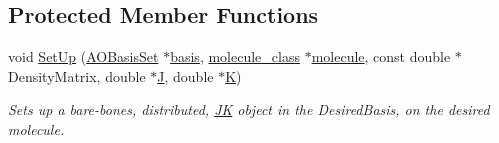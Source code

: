 \subsection*{Protected Member Functions}
\begin{DoxyCompactItemize}
\item 
void \hyperlink{classJKBuilder_1_1JK_a13b685265e196c183897777ec2f3136a}{SetUp} (\hyperlink{classJKBuilder_1_1AOBasisSet}{AOBasisSet} $\ast$\hyperlink{classJKBuilder_1_1JK_a81392b84b45d3cf84c5c105e9fd5d09c}{basis}, \hyperlink{classJKBuilder_1_1molecule__class}{molecule\_\-class} $\ast$\hyperlink{classJKBuilder_1_1JK_ad646bdee4fc9f601f954b4a98c4da476}{molecule}, const double $\ast$DensityMatrix, double $\ast$\hyperlink{classJKBuilder_1_1JK_aa04a91cc219b5dabfce19d5316f96887}{J}, double $\ast$\hyperlink{classJKBuilder_1_1JK_a5160b673d25f0110d98097f8e7364315}{K})
\begin{DoxyCompactList}\small\item\em Sets up a bare-\/bones, distributed, \hyperlink{classJKBuilder_1_1JK}{JK} object in the DesiredBasis, on the desired molecule. \item\end{DoxyCompactList}\end{DoxyCompactItemize}
